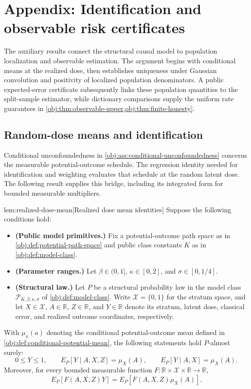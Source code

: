 \section{Appendix: Identification and observable risk certificates}

The auxiliary results connect the structural causal model to population localization and observable estimation. The argument begins with conditional means at the realized dose, then establishes uniqueness under Gaussian convolution and positivity of localized population denominators. A public expected-error certificate subsequently links these population quantities to the split-sample estimator, while dictionary comparisons supply the uniform rate guarantees in \cref{obj:thm:observable-upper,obj:thm:finite-honesty}.

\subsection{Random-dose means and identification}

Conditional unconfoundedness in \cref{obj:ass:conditional-unconfoundedness} concerns the measurable potential-outcome schedule. The regression identity needed for identification and weighting evaluates that schedule at the random latent dose. The following result supplies this bridge, including its integrated form for bounded measurable multipliers.

\begin{lemmav}{lem:realized-dose-mean}[Realized dose mean identities]
Suppose the following conditions hold:
\begin{itemize}
\item \textbf{(Public model primitives.)} Fix a potential-outcome path space as in \cref{obj:def:potential-path-space} and public class constants \(K\) as in \cref{obj:def:model-class}.
\item \textbf{(Parameter ranges.)} Let \(\beta\in(0,1]\), \(\kappa\in[0,2]\), and \(\sigma\in[0,1/4]\).
\item \textbf{(Structural law.)} Let \(P\) be a structural probability law in the model class \(\mathcal P_{K,\beta,\kappa,\sigma}\) of \cref{obj:def:model-class}. Write \(\mathcal X=\{0,1\}\) for the stratum space, and let \(X\in\mathcal X\), \(A\in\mathbb R\), \(Z\in\mathbb R\), and \(Y\in\mathbb R\) denote its stratum, latent dose, classical error, and realized outcome coordinates, respectively.
\end{itemize}
With \(\mu_x(a)\) denoting the conditional potential-outcome mean defined in \cref{obj:def:conditional-potential-mean}, the following statements hold \(P\)-almost surely:
\[
0\le Y\le1,\qquad
E_P[Y\mid A,X,Z]=\mu_X(A),\qquad
E_P[Y\mid A,X]=\mu_X(A).
\]
Moreover, for every bounded measurable function
\(F:\mathbb R\times\mathcal X\times\mathbb R\to\mathbb R\),
\[
E_P\!\left[F(A,X,Z)Y\right]
=
E_P\!\left[F(A,X,Z)\mu_X(A)\right].
\]
\end{lemmav}

